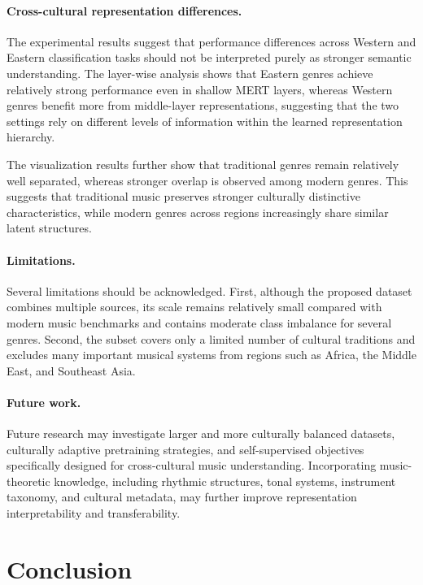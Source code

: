 \documentclass{article}
\begin{document}
\paragraph{Cross-cultural representation differences.}
The experimental results suggest that performance differences across Western and Eastern classification tasks should not be interpreted purely as stronger semantic understanding. The layer-wise analysis shows that Eastern genres achieve relatively strong performance even in shallow MERT layers, whereas Western genres benefit more from middle-layer representations, suggesting that the two settings rely on different levels of information within the learned representation hierarchy.

The visualization results further show that traditional genres remain relatively well separated, whereas stronger overlap is observed among modern genres. This suggests that traditional music preserves stronger culturally distinctive characteristics, while modern genres across regions increasingly share similar latent structures.

\paragraph{Limitations.}
Several limitations should be acknowledged. First, although the proposed dataset combines multiple sources, its scale remains relatively small compared with modern music benchmarks and contains moderate class imbalance for several genres. Second, the subset covers only a limited number of cultural traditions and excludes many important musical systems from regions such as Africa, the Middle East, and Southeast Asia.

\paragraph{Future work.}
Future research may investigate larger and more culturally balanced datasets, culturally adaptive pretraining strategies, and self-supervised objectives specifically designed for cross-cultural music understanding. Incorporating music-theoretic knowledge, including rhythmic structures, tonal systems, instrument taxonomy, and cultural metadata, may further improve representation interpretability and transferability.

\section{Conclusion}
\end{document}
